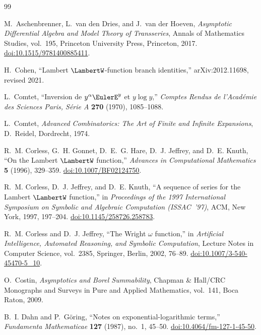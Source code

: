 \documentclass[11pt,oneside]{article}
\theoremstyle{plain}
\theoremstyle{definition}
\theoremstyle{remark}
\begin{document}
\clearpage
\begin{thebibliography}{99}

M.~Aschenbrenner, L.~van den Dries, and J.~van der Hoeven,
\emph{Asymptotic Differential Algebra and Model Theory of Transseries},
Annals of Mathematics Studies, vol.~195, Princeton University Press,
Princeton, 2017.
\href{https://doi.org/10.1515/9781400885411}{doi:10.1515/9781400885411}.

H.~Cohen,
``Lambert \(\LambertW\)-function branch identities,''
arXiv:2012.11698, revised 2021.

L.~Comtet,
``Inversion de \(y^{\alpha}\EulerE^{y}\) et \(y\log y\),''
\emph{Comptes Rendus de l'Acad\'emie des Sciences Paris, S\'erie A}
\textbf{270} (1970), 1085--1088.

L.~Comtet,
\emph{Advanced Combinatorics: The Art of Finite and Infinite Expansions},
D.~Reidel, Dordrecht, 1974.

R.~M. Corless, G.~H. Gonnet, D.~E.~G. Hare, D.~J. Jeffrey, and D.~E. Knuth,
``On the Lambert \(\LambertW\) function,''
\emph{Advances in Computational Mathematics} \textbf{5} (1996), 329--359.
\href{https://doi.org/10.1007/BF02124750}{doi:10.1007/BF02124750}.

R.~M. Corless, D.~J. Jeffrey, and D.~E. Knuth,
``A sequence of series for the Lambert \(\LambertW\) function,''
in \emph{Proceedings of the 1997 International Symposium on Symbolic and
Algebraic Computation (ISSAC~'97)}, ACM, New York, 1997, 197--204.
\href{https://doi.org/10.1145/258726.258783}{doi:10.1145/258726.258783}.

R.~M. Corless and D.~J. Jeffrey,
``The Wright \(\omega\) function,''
in \emph{Artificial Intelligence, Automated Reasoning, and Symbolic
Computation}, Lecture Notes in Computer Science, vol.~2385, Springer, Berlin,
2002, 76--89.
\href{https://doi.org/10.1007/3-540-45470-5_10}{doi:10.1007/3-540-45470-5\_10}.

O.~Costin,
\emph{Asymptotics and Borel Summability},
Chapman \& Hall/CRC Monographs and Surveys in Pure and Applied Mathematics,
vol.~141, Boca Raton, 2009.

B.~I. Dahn and P.~G\"oring,
``Notes on exponential-logarithmic terms,''
\emph{Fundamenta Mathematicae} \textbf{127} (1987), no.~1, 45--50.
\href{https://doi.org/10.4064/fm-127-1-45-50}{doi:10.4064/fm-127-1-45-50}.


\end{thebibliography}
\end{document}
